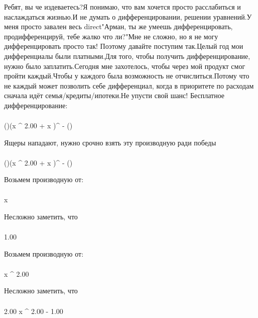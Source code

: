 Ребят, вы че издеваетесь?Я понимаю, что вам хочется просто расслабиться и наслаждаться жизнью.И не думать о дифференцировании, решении уравнений.У меня просто завален весь direct"Арман, ты же умеешь дифференцировать, продифференцируй, тебе жалко что ли?"Мне не сложно, но я не могу дифференцировать просто так! Поэтому давайте поступим так.Целый год мои дифференциалы были платными.Для того, чтобы получить дифференцирование, нужно было заплатить.Сегодня мне захотелось, чтобы через мой продукт смог пройти каждый.Чтобы у каждого была возможность не отчислиться.Потому что не каждый может позволить себе дифференциал, когда в приоритете по расходам сначала идёт семья/кредиты/ипотеки.Не упусти свой шанс! Бесплатное дифференцирование: 
\begin{gather}
\end{gather}
\begin{}
()\cdot (x ^ {2.00 }+ \sin x )^ {- \arcsin ()}\\
\end{}
Ящеры нападают, нужно срочно взять эту производную ради победы
\begin{gather}
\end{gather}
\begin{}
()\cdot (x ^ {2.00 }+ \sin x )^ {- \arcsin ()}\\
\end{}
Возьмем производную от:
\begin{gather}
\end{gather}
\begin{}
x \\
\end{}
Несложно заметить, что
\begin{gather}
\end{gather}
\begin{}
1.00 \\
\end{}
Возьмем производную от:
\begin{gather}
\end{gather}
\begin{}
x ^ {2.00 }\\
\end{}
Несложно заметить, что
\begin{gather}
\end{gather}
\begin{}
2.00  \cdot x ^ {2.00 - 1.00 }\\
\end{}

